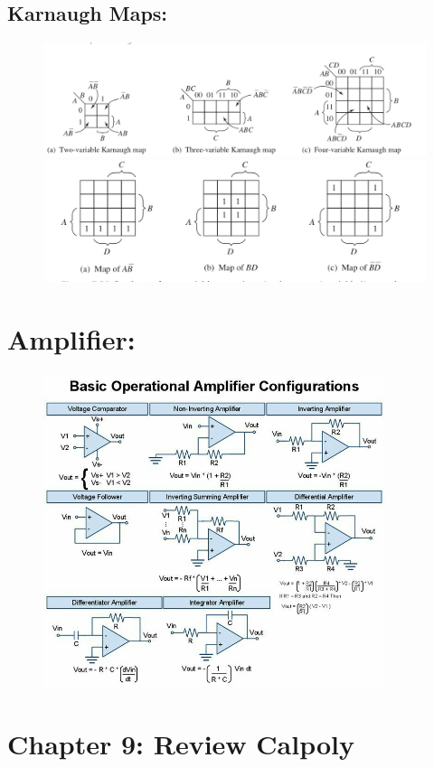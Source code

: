 \documentclass[a4paper,12]{article}
\begin{document}
     \subsection{Karnaugh Maps:}
     \begin{figure}[H]
         \centering
         \includegraphics[width=150mm]{Image/41.jpg}
         \includegraphics[width=120mm]{Image/42.jpg}
     \end{figure}
     
     \section{Amplifier:}
     \begin{figure}[H]
         \centering
         \includegraphics[width=100mm]{Image/Amplifier.jpg}
     \end{figure}
\section{Chapter 9: Review Calpoly}
\end{document}
